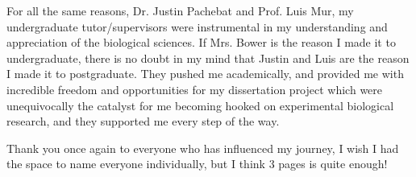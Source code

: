 For all the same reasons, Dr. Justin Pachebat and Prof. Luis Mur, my undergraduate tutor/supervisors were instrumental in my understanding and appreciation of the biological sciences. If Mrs. Bower is the reason I made it to undergraduate, there is no doubt in my mind that Justin and Luis are the reason I made it to postgraduate. They pushed me academically, and provided me with incredible freedom and opportunities for my dissertation project which were unequivocally the catalyst for me becoming hooked on experimental biological research, and they supported me every step of the way.

Thank you once again to everyone who has influenced my journey, I wish I had the space to name everyone individually, but I think 3 pages is quite enough!

\vfill
